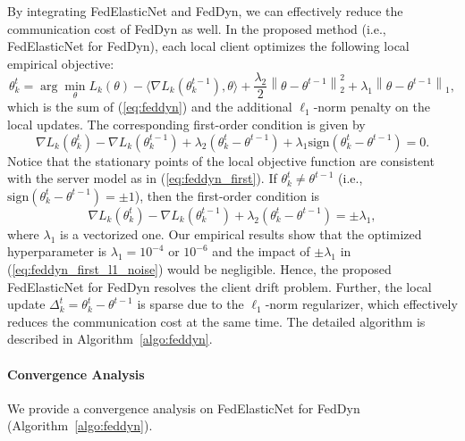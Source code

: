 \documentclass{article} %
\begin{document}
By integrating FedElasticNet and FedDyn, we can effectively reduce the communication cost of FedDyn as well. In the proposed method (i.e., FedElasticNet for FedDyn), each local client optimizes the following local empirical objective: 
\begin{equation}\label{eq:feddyn_l1}
    \theta_{k}^{t} = \arg\min_\theta  L_{k}\left ( \theta \right ) - \langle \nabla L_{k} (\theta_k^{t-1}), \theta\rangle + \frac{\lambda_2}{2} \left\| \theta - \theta^{t-1}\right\|^{2}_{2} + \lambda_1 \left\| \theta - \theta^{t-1} \right\|_1, 
\end{equation}
which is the sum of (\ref{eq:feddyn}) and the additional $\ell_1$-norm penalty on the local updates. The corresponding first-order condition is given by 
\begin{equation} \label{eq:feddyn_first_l1}
    \nabla L_k(\theta_k^t) - \nabla L_k(\theta_k^{t-1}) + \lambda_2 (\theta_k^t - \theta^{t-1}) + \lambda_1 \text{sign}(\theta_k^t - \theta^{t-1}) = 0.
\end{equation}
Notice that the stationary points of the local objective function are consistent with the server model as in (\ref{eq:feddyn_first}). If $\theta_k^t \ne \theta^{t-1}$ (i.e., $\text{sign}(\theta_k^t - \theta^{t-1}) = \pm 1$), then the first-order condition is
\begin{equation} \label{eq:feddyn_first_l1_noise}
    \nabla L_k(\theta_k^t) - \nabla L_k(\theta_k^{t-1}) + \lambda_2 (\theta_k^t - \theta^{t-1}) = \pm \lambda_1,
\end{equation}
where $\lambda_1$ is a vectorized one. Our empirical results show that the optimized hyperparameter is $\lambda_1 = 10^{-4}$ or $10^{-6}$ and the impact of $\pm \lambda_1$ in (\ref{eq:feddyn_first_l1_noise}) would be negligible. Hence, the proposed FedElasticNet for FedDyn resolves the client drift problem. Further, the local update $\Delta_k^t = \theta_k^t - \theta^{t-1}$ is sparse due to the $\ell_1$-norm regularizer, which effectively reduces the communication cost at the same time. The detailed algorithm is described in Algorithm~\ref{algo:feddyn}. 


%
\paragraph{Convergence Analysis}

We provide a convergence analysis on FedElasticNet for FedDyn (Algorithm~\ref{algo:feddyn}). 
\end{document}

